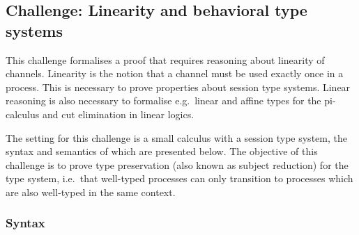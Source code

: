 \subsection{Challenge: Linearity and behavioral type systems}
\label{sec:challenge:linearity-beh-types}

This challenge formalises a proof that requires reasoning about linearity of channels.
Linearity is the notion that a channel must be used exactly once in a process.
This is necessary to prove properties about session type systems.
Linear reasoning is also necessary to formalise e.g.\ linear and affine types for the pi-calculus and cut elimination in linear logics.

The setting for this challenge is a small calculus with a session type system, the syntax and semantics of which are presented below.
The objective of this challenge is to prove type preservation (also known as subject reduction) for the type system, i.e.\ that well-typed processes can only transition to processes which are also well-typed in the same context.

\subsubsection{Syntax}


